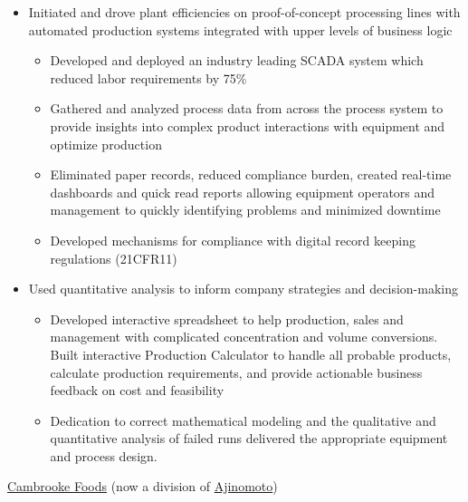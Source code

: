 \documentclass[10pt,a4paper]{article} %
\begin{document}
{{{\begin{itemize}
\item Initiated and drove plant efficiencies on proof-of-concept processing lines with automated production systems integrated with upper levels of business logic 
    \begin{itemize}
    \item Developed and deployed an industry leading SCADA system which reduced labor requirements by 75\%
    \item Gathered and analyzed process data from across the process system to provide insights into complex product interactions with equipment and optimize production 
    \item Eliminated paper records, reduced compliance burden, created real-time dashboards and quick read reports allowing equipment operators and management to quickly identifying problems and minimized downtime
    \item Developed mechanisms for compliance with digital record keeping regulations (21CFR11)  
    \end{itemize}

\item Used quantitative analysis to inform company strategies and decision-making 

\begin{itemize}
    \item Developed interactive spreadsheet to help production, sales and management with complicated concentration and volume conversions. Built interactive Production Calculator to handle all probable products, calculate production requirements, and provide actionable business feedback on cost and feasibility
    \item Dedication to correct mathematical modeling and the qualitative and quantitative analysis of failed runs delivered the appropriate equipment and process design. 
\end{itemize}
\end{itemize}
}
}
}
\headedsection %
{\href{http://www.cambrooke.com}{Cambrooke Foods} (now a division of \href{https://www.ajinorthamerica.com/}{Ajinomoto})}
\end{document}

